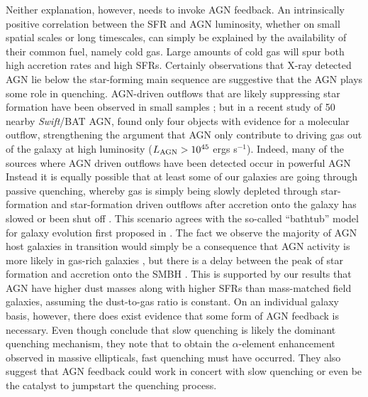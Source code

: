 \documentclass[fleqn, usenatbib]{mnras}
\newcommand{\swift}{\textit{Swift}}
\begin{document}
Neither explanation, however, needs to invoke AGN feedback. An intrinsically positive correlation between the SFR and AGN luminosity, whether on small spatial scales or long timescales, can simply be explained by the availability of their common fuel, namely cold gas. Large amounts of cold gas will spur both high accretion rates and high SFRs. Certainly observations that X-ray detected AGN lie below the star-forming main sequence \citep{Shimizu:2015xo, Matsuoka:2015fk, Mullaney:2015wn} are suggestive that the AGN plays some role in quenching. AGN-driven outflows that are likely suppressing star formation have been observed in small samples \citep{Veilleux:2013qq, Cicone:2014ty, Tombesi:2015fj}; but in a recent study of 50 nearby \swift/BAT AGN, \citet{Stone:2016zl} found only four objects with evidence for a molecular outflow, strengthening the argument that AGN only contribute to driving gas out of the galaxy at high luminosity ($L_{\rm AGN} > 10^{45}$ ergs s$^{-1}$). Indeed, many of the sources where AGN driven outflows have been detected occur in powerful AGN \citep[e.g.][]{Cano-Diaz:2012en,Brusa:2015qk,Cresci:2015tk,Perna:2015rd} Instead it is equally possible that at least some of our galaxies are going through passive quenching, whereby gas is simply being slowly depleted through star-formation and star-formation driven outflows after accretion onto the galaxy has slowed or been shut off \citep{Peng:2015yg}. This scenario agrees with the so-called ``bathtub'' model for galaxy evolution first proposed in \citet{Lilly:2013pd}. The fact we observe the majority of AGN host galaxies in transition would simply be a consequence that AGN activity is more likely in gas-rich galaxies \citep{Vito:2014eu}, but there is a delay between the peak of star formation and accretion onto the SMBH \citep{Davies:2007kx, Schawinski:2014cr}. This is supported by our results that AGN have higher dust masses along with higher SFRs than mass-matched field galaxies, assuming the dust-to-gas ratio is constant. On an individual galaxy basis, however, there does exist evidence that some form of AGN feedback is necessary.  Even though \citep{Peng:2015yg} conclude that slow quenching is likely the dominant quenching mechanism, they note that to obtain the $\alpha$-element enhancement observed in massive ellipticals, fast quenching must have occurred. They also suggest that AGN feedback could work in concert with slow quenching or even be the catalyst to jumpstart the quenching process.
 
\end{document}
